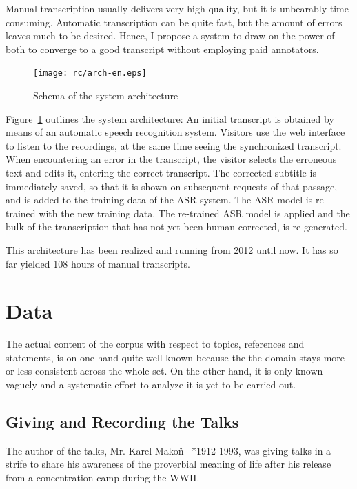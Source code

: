\documentclass[12pt,a4paper]{report}
\begin{document}
Manual transcription usually delivers very high quality, but it is unbearably
time-consuming. Automatic transcription can be quite fast, but the amount of
errors leaves much to be desired. Hence, I propose a system
to draw on the power of both to converge to a good transcript without employing
paid annotators.

\begin{figure}[htpb]
\texttt{[image: rc/arch-en.eps]}
\caption{Schema of the system architecture}
\label{fig:arch}
\end{figure}

Figure~\ref{fig:arch} outlines the system architecture:
{An initial transcript is obtained by means of an automatic speech recognition
system.\label{enum:arch:init}}
{Visitors use the web interface to listen to the recordings,
at the same time seeing the synchronized transcript.}
{When encountering an error in the transcript, the visitor selects the
erroneous text and edits it, entering the correct transcript.}
{The corrected subtitle is immediately saved, so that it is shown on
subsequent requests of that passage, and
is added to the training data of the ASR system.}
{The ASR model is re-trained with the new training data.}
{The re-trained ASR model is applied and the bulk of the transcription that
has not yet been human-corrected, is re-generated.}

This architecture has been realized and running from 2012 until now. It has so
far yielded 108 hours of manual transcripts.


\chapter{Data}

The actual content of the corpus with respect to topics, references and
statements, is on one hand quite well known
because the the domain stays
more or less consistent across the whole set. On the other hand, it is only
known vaguely and a systematic effort to analyze it is yet to be carried out.

\section{Giving and Recording the Talks}

The author of the talks, Mr. Karel Mako\v{n}~\cite{hajek2007cesky} *1912
\textdagger{}1993, was giving talks in a strife to share his awareness of the
proverbial meaning of life after his
release from a concentration camp during the WWII.
\end{document}
